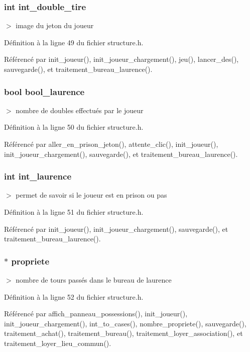 \subsubsection{\setlength{\rightskip}{0pt plus 5cm}int {\bf int\_\-double\_\-tire}}\label{structjoueur_383352e8bd61fe737ca01b2ad37da4a4}


$>$ image du jeton du joueur 



D\'{e}finition \`{a} la ligne 49 du fichier structure.h.

R\'{e}f\'{e}renc\'{e} par init\_\-joueur(), init\_\-joueur\_\-chargement(), jeu(), lancer\_\-des(), sauvegarde(), et traitement\_\-bureau\_\-laurence().
\subsubsection{\setlength{\rightskip}{0pt plus 5cm}bool {\bf bool\_\-laurence}}\label{structjoueur_9674676a40014e7c313f37a481b70bb4}


$>$ nombre de doubles effectu\'{e}s par le joueur 



D\'{e}finition \`{a} la ligne 50 du fichier structure.h.

R\'{e}f\'{e}renc\'{e} par aller\_\-en\_\-prison\_\-jeton(), attente\_\-clic(), init\_\-joueur(), init\_\-joueur\_\-chargement(), sauvegarde(), et traitement\_\-bureau\_\-laurence().
\subsubsection{\setlength{\rightskip}{0pt plus 5cm}int {\bf int\_\-laurence}}\label{structjoueur_a9f44bfa8a4fd3de8b1de51a1c3c2f8e}


$>$ permet de savoir si le joueur est en prison ou pas 



D\'{e}finition \`{a} la ligne 51 du fichier structure.h.

R\'{e}f\'{e}renc\'{e} par init\_\-joueur(), init\_\-joueur\_\-chargement(), sauvegarde(), et traitement\_\-bureau\_\-laurence().
\subsubsection{$\ast$ {\bf propriete}}\label{structjoueur_90b8cedf328ed1f09cfafc9627146043}


$>$ nombre de tours pass\'{e}s dans le bureau de laurence 



D\'{e}finition \`{a} la ligne 52 du fichier structure.h.

R\'{e}f\'{e}renc\'{e} par affich\_\-panneau\_\-possessions(), init\_\-joueur(), init\_\-joueur\_\-chargement(), int\_\-to\_\-cases(), nombre\_\-propriete(), sauvegarde(), traitement\_\-achat(), traitement\_\-bureau(), traitement\_\-loyer\_\-association(), et traitement\_\-loyer\_\-lieu\_\-commun().